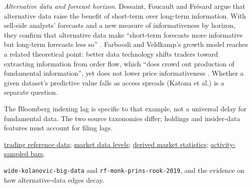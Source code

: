 \begin{qfdefinition}
\emph{Alternative data and forecast horizon}. Dessaint, Foucault and Fr\'esard argue that alternative data raise the benefit of short-term over long-term information. With sell-side analysts' forecasts and a new measure of informativeness by horizon, they confirm that alternative data make ``short-term forecasts more informative but long-term forecasts less so'' \citep[working-paper version of 20 July 2021, not the 2024 article, abstract and sec.~I]{rf-dessaint-foucault-fresard-2024}. Farboodi and Veldkamp's growth model reaches a related theoretical point: better data technology shifts traders toward extracting information from order flow, which ``does crowd out production of fundamental information'', yet does not lower price informativeness \citep[NBER WP 23457, May 2017, not the 2020 article, abstract]{rf-farboodi-veldkamp-2020}. Whether a given dataset's predictive value falls as access spreads (Katona et al.) is a separate question.

 The Bloomberg indexing lag is specific to that example, not a universal delay for fundamental data. The two source taxonomies differ; holdings and insider-data features must account for filing lags.

 \hyperref[data:trading-reference-data]{trading reference data}; \hyperref[data:market-data-levels]{market data levels}; \hyperref[data:derived-market-statistics]{derived market statistics}; \hyperref[meth:activity-sampled-bars]{activity-sampled bars}.

 \nolinkurl{wide-kolanovic-big-data} and \nolinkurl{rf-monk-prins-rook-2019}, and the evidence on how alternative-data edges decay.

\end{qfdefinition}
